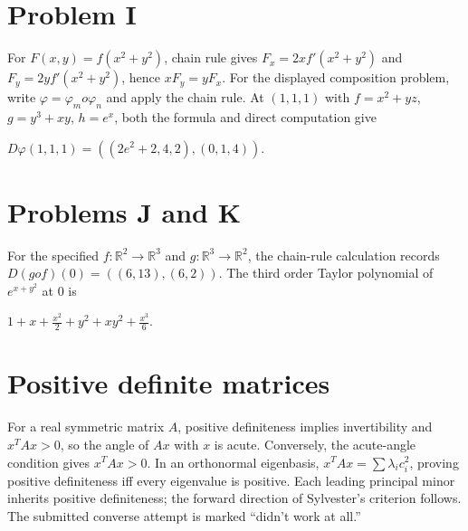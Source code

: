 \section{Problem I}

For \(F\left( {x,y} \right) = f\left( {x^{2} + y^{2}} \right)\), chain rule gives \(F_{x} = 2xf'\left( {x^{2} + y^{2}} \right)\) and \(F_{y} = 2yf'\left( {x^{2} + y^{2}} \right)\), hence \(xF_{y} = yF_{x}\). For the displayed composition problem, write \(\varphi = \varphi_{m}o\varphi_{n}\) and apply the chain rule. At \(\left( {1,1,1} \right)\) with \(f = x^{2} + yz\), \(g = y^{3} + xy\), \(h = e^{x}\), both the formula and direct computation give

\(D\varphi\left( {1,1,1} \right) = \left( {\left( {2e^{2} + 2,4,2} \right),\left( {0,1,4} \right)} \right).\)

\section{Problems J and K}

For the specified \(f:\mathbb{R}^{2}\rightarrow\mathbb{R}^{3}\) and \(g:\mathbb{R}^{3}\rightarrow\mathbb{R}^{2}\), the chain-rule calculation records \(D\left( {gof} \right)(0) = \left( {\left( {6,13} \right),\left( {6,2} \right)} \right)\). The third order Taylor polynomial of \(e^{x + y^{2}}\) at \(0\) is

\(1 + x + \frac{x^{2}}{2} + y^{2} + xy^{2} + \frac{x^{3}}{6}\).

\section{Positive definite matrices}

For a real symmetric matrix \(A\), positive definiteness implies invertibility and \(x^{T}Ax > 0\), so the angle of \(Ax\) with \(x\) is acute. Conversely, the acute-angle condition gives \(x^{T}Ax > 0\). In an orthonormal eigenbasis, \(x^{T}Ax = \sum\lambda_{i}c_{i}^{2}\), proving positive definiteness iff every eigenvalue is positive. Each leading principal minor inherits positive definiteness; the forward direction of Sylvester's criterion follows. The submitted converse attempt is marked ``didn't work at all.''
